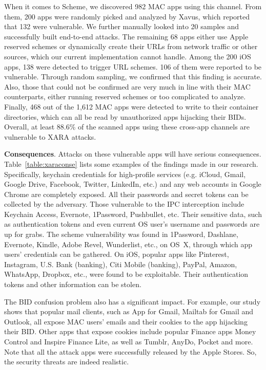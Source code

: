 \documentclass{article}
\newcommand{\ignore}[1]{}
\begin{document}
When it comes to Scheme, we discovered 982 MAC apps using this channel. From them, 200 apps were randomly picked and analyzed by Xavus, which reported that 132 were vulnerable. We further manually looked into 20 samples and successfully built end-to-end attacks.  The remaining 68 apps either use Apple reserved schemes or dynamically create their URLs from network traffic or other sources, which our current implementation cannot handle. Among the 200 iOS apps, 138 were detected to trigger URL schemes. 106 of them were reported to be vulnerable. Through random sampling, we confirmed that this finding is accurate. Also, those that could not be confirmed are very much in line with their MAC counterparts, either running reserved schemes or too complicated to analyze. Finally, 468 out of the 1,612 MAC apps were detected to write to their container directories, which can all be read by unauthorized apps hijacking their BIDs. Overall, at least 88.6\% of the scanned apps using these cross-app channels are vulnerable to XARA attacks.

\vspace {3pt}\noindent\textbf{Consequences}. Attacks on these vulnerable apps will have serious consequences. Table~\ref{table:xaraconse} lists some examples of the findings made in our research. Specifically, keychain credentials for high-profile services (e.g. iCloud, Gmail, Google Drive, Facebook, Twitter, LinkedIn, etc.) and any web accounts in Google Chrome are completely exposed. All their passwords and secret tokens can be collected by the adversary. Those vulnerable to the IPC interception include Keychain Access, Evernote, 1Password, Pushbullet, etc. Their sensitive data, such as authentication tokens and even current OS user's username and passwords are up for grabs.  The scheme vulnerability was found in 1Password, Dashlane, Evernote, Kindle, Adobe Revel, Wunderlist, etc., on OS~X, through which app users' credentials can be gathered. On iOS, popular apps like Pinterest, Instagram, U.S. Bank (banking), Citi Mobile (banking), PayPal, Amazon, WhatsApp, Dropbox, etc., were found to be exploitable. Their authentication tokens and other information can be stolen.





The BID confusion problem also has a significant impact. For example, our study shows that popular mail clients, such as App for Gmail, Mailtab for Gmail and Outlook, all expose MAC users' emails and their cookies to the app hijacking their BID.\ignore{ Also, Contacts Sync for Gmail was also detected to expose its cookie.}  Other apps that expose cookies include popular Finance apps Money Control and Inspire Finance Lite, as well as Tumblr, AnyDo, Pocket and more. Note that all the attack apps were successfully released by the Apple Stores. So, the security threats are indeed realistic.
\end{document}
